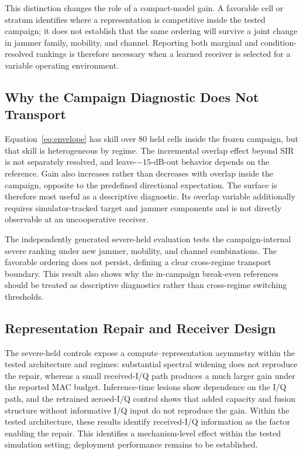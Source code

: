 \documentclass[letterpaper,journal]{IEEEtran}
\begin{document}
This distinction changes the role of a compact-model gain. A favorable cell or
stratum identifies where a representation is competitive inside the tested
campaign; it does not establish that the same ordering will survive a joint
change in jammer family, mobility, and channel. Reporting both marginal and
condition-resolved rankings is therefore necessary when a learned receiver is
selected for a variable operating environment.

\subsection{Why the Campaign Diagnostic Does Not Transport}
Equation~\eqref{eq:envelope} has skill over 80 held cells inside the frozen
campaign, but that skill is heterogeneous by regime. The incremental overlap
effect beyond SIR is not separately resolved, and leave-$-15$-dB-out behavior
depends on the reference. Gain also increases rather than decreases with
overlap inside the campaign, opposite to the predefined directional
expectation. The surface is therefore most useful as a descriptive diagnostic.
Its overlap variable additionally requires
simulator-tracked target and jammer components and is not directly observable
at an uncooperative receiver.

The independently generated severe-held evaluation tests the campaign-internal
severe ranking under new jammer, mobility, and channel combinations. The
favorable ordering does not persist, defining a clear cross-regime transport
boundary. This result also shows why the in-campaign break-even references
should be treated as descriptive diagnostics rather than cross-regime
switching thresholds.

\subsection{Representation Repair and Receiver Design}
The severe-held controls expose a compute--representation asymmetry within the
tested architecture and regimes: substantial spectral widening does not
reproduce the repair, whereas a small received-I/Q path produces a much larger
gain under the reported MAC budget. Inference-time lesions show dependence
on the I/Q path, and the retrained zeroed-I/Q control shows that added capacity
and fusion structure without informative I/Q input do not reproduce the gain.
Within the tested architecture, these results identify received-I/Q
information as the factor enabling the repair. This identifies a mechanism-level
effect within the tested simulation setting; deployment performance remains to
be established.
\end{document}
